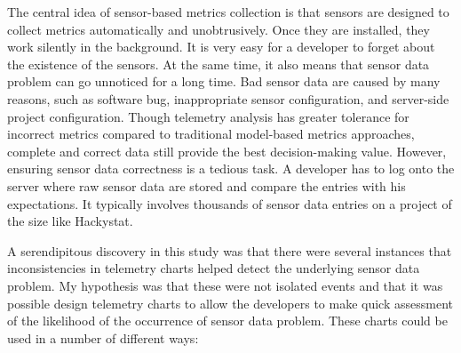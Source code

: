 The central idea of sensor-based metrics collection is that sensors are designed to collect metrics automatically and unobtrusively. Once they are installed, they work silently in the background. It is very easy for a developer to forget about the existence of the sensors. At the same time, it also means that sensor data problem can go unnoticed for a long time. Bad sensor data are caused by many reasons, such as software bug, inappropriate sensor configuration, and server-side project configuration. Though telemetry analysis has greater tolerance for incorrect metrics compared to traditional model-based metrics approaches, complete and correct data still provide the best decision-making value. However, ensuring sensor data correctness is a tedious task. A developer has to log onto the server where raw sensor data are stored and compare the entries with his expectations. It typically involves thousands of sensor data entries on a project of the size like Hackystat.

A serendipitous discovery in this study was that there were several instances that inconsistencies in telemetry charts helped detect the underlying sensor data problem. 
My hypothesis was that these were not isolated events and that it was possible design telemetry charts to allow the developers to make quick assessment of the likelihood of the occurrence of sensor data problem. These charts could be used in a number of different ways:


